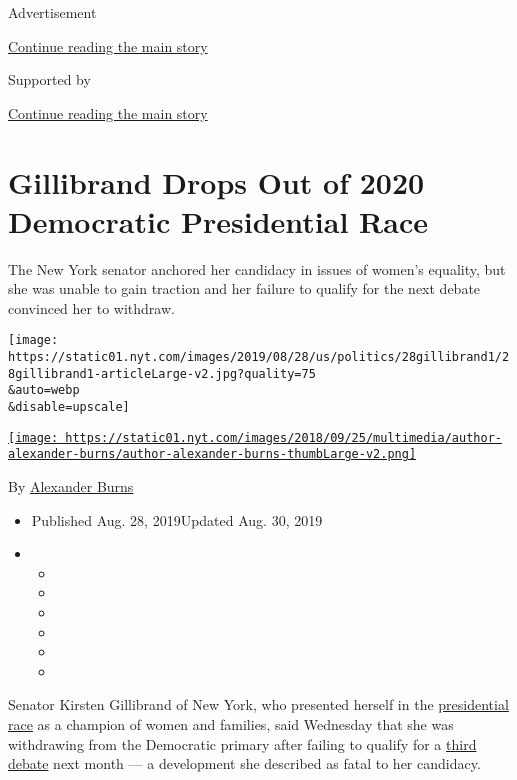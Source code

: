 Advertisement

\protect\hyperlink{after-top}{Continue reading the main story}

Supported by

\protect\hyperlink{after-sponsor}{Continue reading the main story}

\hypertarget{gillibrand-drops-out-of-2020-democratic-presidential-race}{%
\section{Gillibrand Drops Out of 2020 Democratic Presidential
Race}\label{gillibrand-drops-out-of-2020-democratic-presidential-race}}

The New York senator anchored her candidacy in issues of women's
equality, but she was unable to gain traction and her failure to qualify
for the next debate convinced her to withdraw.

\texttt{[image: https://static01.nyt.com/images/2019/08/28/us/politics/28gillibrand1/28gillibrand1-articleLarge-v2.jpg?quality=75\\\&auto=webp\\\&disable=upscale]}

\href{https://www.nytimes.com/by/alexander-burns}{\texttt{[image: https://static01.nyt.com/images/2018/09/25/multimedia/author-alexander-burns/author-alexander-burns-thumbLarge-v2.png]}}

By \href{https://www.nytimes.com/by/alexander-burns}{Alexander Burns}

\begin{itemize}
\item
  Published Aug. 28, 2019Updated Aug. 30, 2019
\item
  \begin{itemize}
  \item
  \item
  \item
  \item
  \item
  \item
  \end{itemize}
\end{itemize}

Senator Kirsten Gillibrand of New York, who presented herself in the
\href{https://www.nytimes.com/news-event/2020-election}{presidential
race} as a champion of women and families, said Wednesday that she was
withdrawing from the Democratic primary after failing to qualify for a
\href{https://www.nytimes.com/news-event/democratic-debates}{third
debate} next month --- a development she described as fatal to her
candidacy.

